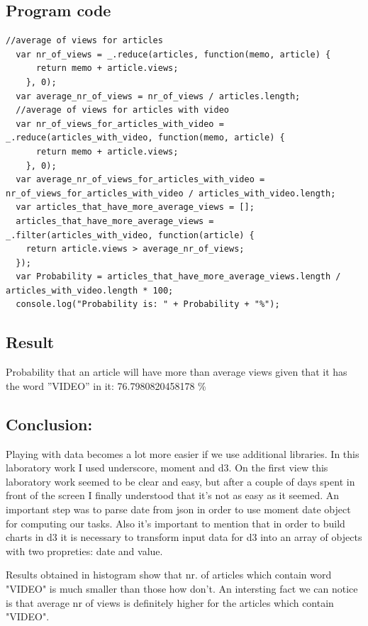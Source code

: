 \documentclass[12pt,a4paper]{article}
\begin{document}
\subsection*{Program code}
\begin{lstlisting}
//average of views for articles
  var nr_of_views = _.reduce(articles, function(memo, article) {
      return memo + article.views;
    }, 0);
  var average_nr_of_views = nr_of_views / articles.length;
  //average of views for articles with video
  var nr_of_views_for_articles_with_video = _.reduce(articles_with_video, function(memo, article) {
      return memo + article.views;
    }, 0);
  var average_nr_of_views_for_articles_with_video = nr_of_views_for_articles_with_video / articles_with_video.length;
  var articles_that_have_more_average_views = [];
  articles_that_have_more_average_views = _.filter(articles_with_video, function(article) {
    return article.views > average_nr_of_views;
  });
  var Probability = articles_that_have_more_average_views.length / articles_with_video.length * 100;
  console.log("Probability is: " + Probability + "%");

\end{lstlisting}
\subsection*{Result}
Probability that an article will have more than average views given
that it has the word ”VIDEO” in it: 76.7980820458178 \%

\subsection*{Conclusion:}

Playing with data becomes a lot more easier if we use additional libraries. In this laboratory work I used underscore, moment and
d3. On the first view this laboratory work seemed to be clear and easy, but after a couple of days spent in front of the screen I finally understood that it's not as easy as it seemed. An important step was to parse date from json in order to use moment date object for computing our tasks. Also it's important to mention that in order to build charts in d3 it is necessary to transform input data for d3 into an array of objects with two propreties: date and value.\\
  \par Results obtained in histogram show that nr. of articles which contain word "VIDEO" is much smaller than those how don't. An intersting fact we can notice is that average nr of views is definitely higher for the articles which contain "VIDEO".
\end{document}
